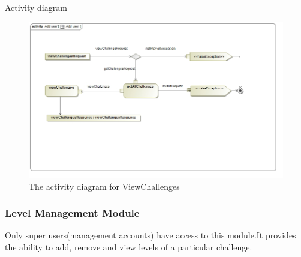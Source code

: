 \documentclass[english]{article}
\begin{document}
\begin{itemize}
\begin{figure}[H]
		 	 \end{figure}
		 	 \newpage
		 	 	\begin{center}
		 	 		Activity diagram
		 	 	\end{center}
		 	 	
		 	 	\begin{figure}[H]
		 	 		\begin{center}
		 	 			\includegraphics[scale=0.2]{ViewChallenges.jpg}
		 	 		\end{center}
		 	 		\caption{The activity diagram for ViewChallenges}
		 	 		
		 	 	\end{figure}
		 	
			
		
		\end{itemize}
		\subsubsection{Level Management Module}
		Only super users(management accounts) have access to this module.It provides the ability to add, remove and view levels of a particular challenge.
		
\end{document}
